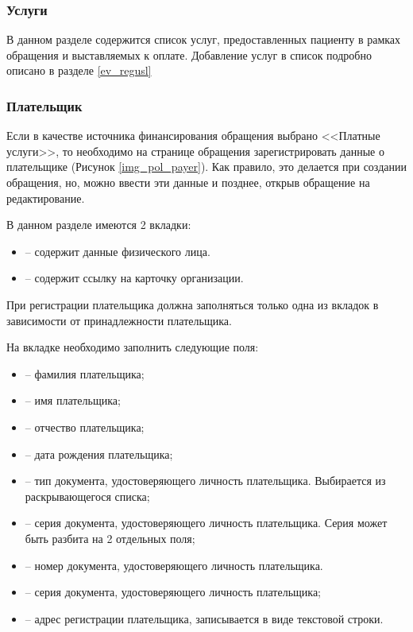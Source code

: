 \subsubsection{Услуги}

В данном разделе содержится список услуг, предоставленных пациенту в рамках обращения и выставляемых к оплате.
Добавление услуг в список подробно описано в разделе \ref{ev_regusl}

\subsubsection{Плательщик} \label{ev_obr_payer}

Если в качестве источника финансирования обращения выбрано <<Платные услуги>>, то необходимо на странице обращения зарегистрировать данные о плательщике (Рисунок \ref{img_pol_payer}). Как правило, это делается при создании обращения, но, можно ввести эти данные и позднее, открыв обращение на редактирование. 

В данном разделе имеются 2 вкладки: 
\begin{itemize}
 \item {} -- содержит данные физического лица.
 \item {} -- содержит ссылку на карточку организации. 
\end{itemize}

При регистрации плательщика должна заполняться только одна из вкладок в зависимости от принадлежности плательщика.

На вкладке  необходимо заполнить следующие поля:
\begin{itemize}
	\item {} -- фамилия плательщика;
	\item {} -- имя плательщика;
	\item {} -- отчество плательщика;
	\item {} -- дата рождения плательщика;
	\item {} -- тип документа, удостоверяющего личность плательщика. Выбирается из раскрывающегося списка;
	\item {} -- серия документа, удостоверяющего личность плательщика. Серия может быть разбита на 2 отдельных поля;
	\item {} -- номер документа, удостоверяющего личность плательщика. 
	\item {} -- серия документа, удостоверяющего личность плательщика;
	\item {} -- адрес регистрации плательщика, записывается в виде текстовой строки. 
\end{itemize}

